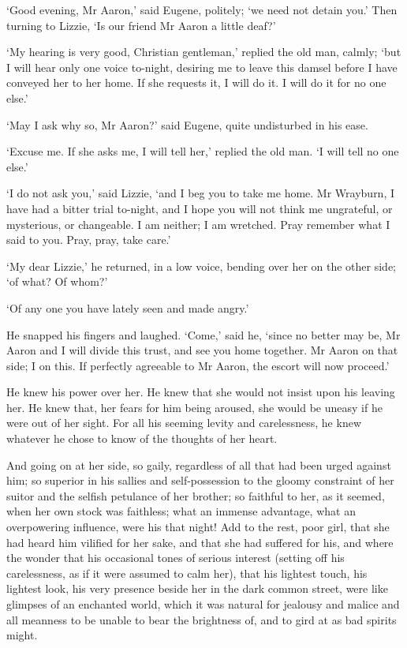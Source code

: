 ‘Good evening, Mr Aaron,’ said Eugene, politely; ‘we need not detain
you.’ Then turning to Lizzie, ‘Is our friend Mr Aaron a little deaf?’

‘My hearing is very good, Christian gentleman,’ replied the old man,
calmly; ‘but I will hear only one voice to-night, desiring me to leave
this damsel before I have conveyed her to her home. If she requests it,
I will do it. I will do it for no one else.’

‘May I ask why so, Mr Aaron?’ said Eugene, quite undisturbed in his
ease.

‘Excuse me. If she asks me, I will tell her,’ replied the old man. ‘I
will tell no one else.’

‘I do not ask you,’ said Lizzie, ‘and I beg you to take me home. Mr
Wrayburn, I have had a bitter trial to-night, and I hope you will not
think me ungrateful, or mysterious, or changeable. I am neither; I am
wretched. Pray remember what I said to you. Pray, pray, take care.’

‘My dear Lizzie,’ he returned, in a low voice, bending over her on the
other side; ‘of what? Of whom?’

‘Of any one you have lately seen and made angry.’

He snapped his fingers and laughed. ‘Come,’ said he, ‘since no better
may be, Mr Aaron and I will divide this trust, and see you home
together. Mr Aaron on that side; I on this. If perfectly agreeable to Mr
Aaron, the escort will now proceed.’

He knew his power over her. He knew that she would not insist upon his
leaving her. He knew that, her fears for him being aroused, she would
be uneasy if he were out of her sight. For all his seeming levity and
carelessness, he knew whatever he chose to know of the thoughts of her
heart.

And going on at her side, so gaily, regardless of all that had been
urged against him; so superior in his sallies and self-possession to
the gloomy constraint of her suitor and the selfish petulance of her
brother; so faithful to her, as it seemed, when her own stock was
faithless; what an immense advantage, what an overpowering influence,
were his that night! Add to the rest, poor girl, that she had heard him
vilified for her sake, and that she had suffered for his, and where the
wonder that his occasional tones of serious interest (setting off his
carelessness, as if it were assumed to calm her), that his lightest
touch, his lightest look, his very presence beside her in the dark
common street, were like glimpses of an enchanted world, which it was
natural for jealousy and malice and all meanness to be unable to bear
the brightness of, and to gird at as bad spirits might.

